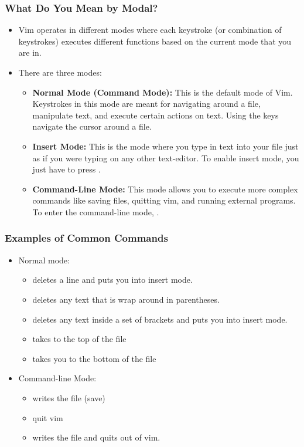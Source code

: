 \documentclass{beamer}
\begin{document}
\begin{frame}
    \frametitle{What Do You Mean by Modal?} 
 \begin{itemize}
     \item Vim operates in different modes where each keystroke (or combination of keystrokes) executes different functions based on the current mode that you are in.  
     \item There are three modes: 
         \begin{itemize}
             \item \textbf{Normal Mode (Command Mode):} This is the default mode of Vim. Keystrokes in this mode are meant for navigating around a file, manipulate text, and execute certain actions on text. Using the keys  navigate the cursor around a file.
             \item \textbf{Insert Mode:} This is the mode where you type in text into your file just as if you were typing on any other text-editor. To enable insert mode, you just have to press .  
             \item \textbf{Command-Line Mode:} This mode allows you to execute more complex commands like saving files, quitting vim, and running external programs. To enter the command-line mode, .
         \end{itemize}
 \end{itemize}  
\end{frame}

\begin{frame}
    \frametitle{Examples of Common Commands} 
    \begin{itemize}
        \item Normal mode:
            \begin{itemize}
                \item {} deletes a line and puts you into insert mode.
                \item  {} deletes any text that is wrap around in parentheses.
                \item \Colorbox{mygray}{\lstinline|ci[|} deletes any text inside a set of brackets and puts you into insert mode.   
                \item {} takes to the top of the file
                \item {} takes you to the bottom of the file
            \end{itemize}
        \item Command-line Mode:
            \begin{itemize}
                \item {} writes the file (save) 
                \item  {} quit vim
                \item {} writes the file and quits out of vim.
            \end{itemize}
    \end{itemize}
\end{frame}
\end{document}
